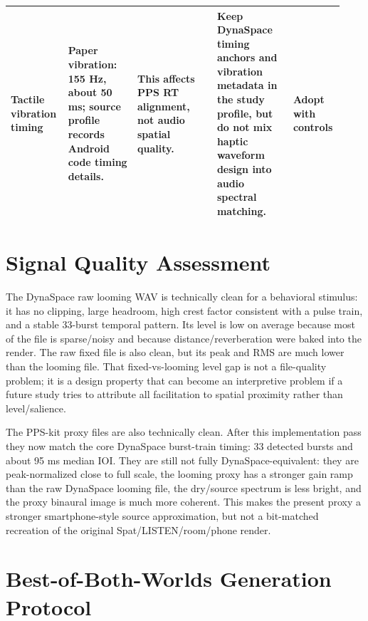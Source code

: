 \documentclass[10pt]{article}
\newcommand{\statusmodify}{\textbf{Adopt with controls}}
\begin{document}
\begin{longtable}{P{0.15\linewidth} P{0.20\linewidth} P{0.23\linewidth} P{0.22\linewidth} P{0.13\linewidth}}
Tactile vibration timing & Paper vibration: 155 Hz, about 50 ms; source profile records Android code timing details. & This affects PPS RT alignment, not audio spatial quality. & Keep DynaSpace timing anchors and vibration metadata in the study profile, but do not mix haptic waveform design into audio spectral matching. & \statusmodify\\
\bottomrule
\end{longtable}

\section*{Signal Quality Assessment}

The DynaSpace raw looming WAV is technically clean for a behavioral stimulus: it has no clipping, large headroom, high crest factor consistent with a pulse train, and a stable 33-burst temporal pattern. Its level is low on average because most of the file is sparse/noisy and because distance/reverberation were baked into the render. The raw fixed file is also clean, but its peak and RMS are much lower than the looming file. That fixed-vs-looming level gap is not a file-quality problem; it is a design property that can become an interpretive problem if a future study tries to attribute all facilitation to spatial proximity rather than level/salience.

The PPS-kit proxy files are also technically clean. After this implementation pass they now match the core DynaSpace burst-train timing: 33 detected bursts and about 95 ms median IOI. They are still not fully DynaSpace-equivalent: they are peak-normalized close to full scale, the looming proxy has a stronger gain ramp than the raw DynaSpace looming file, the dry/source spectrum is less bright, and the proxy binaural image is much more coherent. This makes the present proxy a stronger smartphone-style source approximation, but not a bit-matched recreation of the original Spat/LISTEN/room/phone render.

\section*{Best-of-Both-Worlds Generation Protocol}
\end{document}
